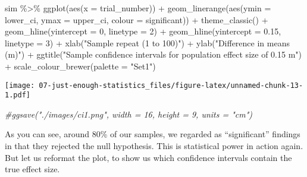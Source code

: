 \documentclass[
]{article}
\newenvironment{Shaded}{\begin{snugshade}}{\end{snugshade}}
\newcommand{\AttributeTok}[1]{\textcolor[rgb]{0.77,0.63,0.00}{#1}}
\newcommand{\CommentTok}[1]{\textcolor[rgb]{0.56,0.35,0.01}{\textit{#1}}}
\newcommand{\DecValTok}[1]{\textcolor[rgb]{0.00,0.00,0.81}{#1}}
\newcommand{\FloatTok}[1]{\textcolor[rgb]{0.00,0.00,0.81}{#1}}
\newcommand{\FunctionTok}[1]{\textcolor[rgb]{0.00,0.00,0.00}{#1}}
\newcommand{\NormalTok}[1]{#1}
\newcommand{\SpecialCharTok}[1]{\textcolor[rgb]{0.00,0.00,0.00}{#1}}
\newcommand{\StringTok}[1]{\textcolor[rgb]{0.31,0.60,0.02}{#1}}
\begin{document}
\begin{Shaded}
\begin{Highlighting}[]
\NormalTok{sim }\SpecialCharTok{\%\textgreater{}\%}
    \FunctionTok{ggplot}\NormalTok{(}\FunctionTok{aes}\NormalTok{(}\AttributeTok{x =}\NormalTok{ trial\_number)) }\SpecialCharTok{+}
    \FunctionTok{geom\_linerange}\NormalTok{(}\FunctionTok{aes}\NormalTok{(}\AttributeTok{ymin =}\NormalTok{ lower\_ci, }\AttributeTok{ymax =}\NormalTok{ upper\_ci, }\AttributeTok{colour =}\NormalTok{ significant)) }\SpecialCharTok{+}
    \FunctionTok{theme\_classic}\NormalTok{() }\SpecialCharTok{+}
    \FunctionTok{geom\_hline}\NormalTok{(}\AttributeTok{yintercept =} \DecValTok{0}\NormalTok{, }\AttributeTok{linetype =} \DecValTok{2}\NormalTok{) }\SpecialCharTok{+}
  \FunctionTok{geom\_hline}\NormalTok{(}\AttributeTok{yintercept =} \FloatTok{0.15}\NormalTok{, }\AttributeTok{linetype =} \DecValTok{3}\NormalTok{) }\SpecialCharTok{+}
    \FunctionTok{xlab}\NormalTok{(}\StringTok{"Sample repeat (1 to 100)"}\NormalTok{) }\SpecialCharTok{+}
  \FunctionTok{ylab}\NormalTok{(}\StringTok{"Difference in means (m)"}\NormalTok{) }\SpecialCharTok{+}
  \FunctionTok{ggtitle}\NormalTok{(}\StringTok{"Sample confidence intervals for population effect size of 0.15 m"}\NormalTok{) }\SpecialCharTok{+}
  \FunctionTok{scale\_colour\_brewer}\NormalTok{(}\AttributeTok{palette =} \StringTok{"Set1"}\NormalTok{)}
\end{Highlighting}
\end{Shaded}

\texttt{[image: 07-just-enough-statistics\_files/figure-latex/unnamed-chunk-13-1.pdf]}

\begin{Shaded}
\begin{Highlighting}[]
\CommentTok{\#ggsave("./images/ci1.png", width = 16, height = 9, units = "cm")}
\end{Highlighting}
\end{Shaded}

As you can see, around 80\% of our samples, we regarded as
``significant'' findings in that they rejected the null hypothesis. This
is statistical power in action again. But let us reformat the plot, to
show us which confidence intervals contain the true effect size.
\end{document}
